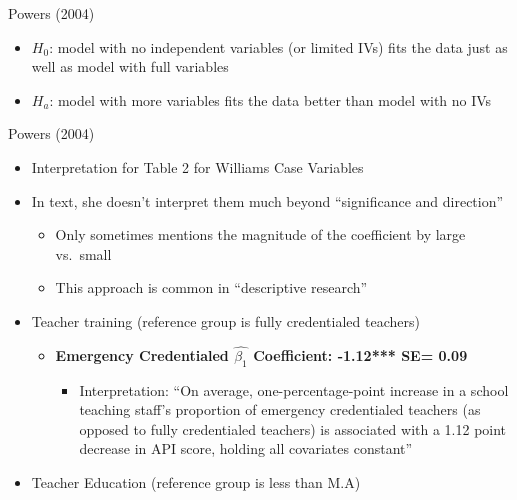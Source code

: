 \documentclass[
  8pt,
  ignorenonframetext,
  dvipsnames]{beamer}
\providecommand{\tightlist}{%
  \setlength{\itemsep}{0pt}\setlength{\parskip}{0pt}}
\renewcommand{\textbf}[1]{{\color{darkgray}\bfseries\fontfamily{Montserrat-TOsF}#1}}
\let\olditem\item
\renewcommand{\item}{%
  \olditem\vspace{4pt}
}
\begin{document}
\begin{frame}{Powers (2004)}
\begin{itemize}
\begin{itemize}
    \begin{itemize}
    \tightlist
    \item
      \(H_0\): model with no independent variables (or limited IVs) fits
      the data just as well as model with full variables
    \item
      \(H_a\): model with more variables fits the data better than model
      with no IVs
    \end{itemize}
  \end{itemize}
\end{itemize}

\end{frame}

\begin{frame}{Powers (2004)}
\protect\hypertarget{powers-2004-2}{}

\begin{itemize}
\tightlist
\item
  Interpretation for Table 2 for Williams Case Variables
\item
  In text, she doesn't interpret them much beyond ``significance and
  direction''

  \begin{itemize}
  \tightlist
  \item
    Only sometimes mentions the magnitude of the coefficient by large
    vs.~small
  \item
    This approach is common in ``descriptive research''
  \end{itemize}
\item
  Teacher training (reference group is fully credentialed teachers)

  \begin{itemize}
  \tightlist
  \item
    \textbf{Emergency Credentialed \(\hat{\beta_1}\) Coefficient:
    -1.12*** SE= 0.09}

    \begin{itemize}
    \tightlist
    \item
      Interpretation: ``On average, one-percentage-point increase in a
      school teaching staff's proportion of emergency credentialed
      teachers (as opposed to fully credentialed teachers) is associated
      with a 1.12 point decrease in API score, holding all covariates
      constant''
    \end{itemize}
  \end{itemize}
\item
  Teacher Education (reference group is less than M.A)


\end{itemize}
\end{frame}
\end{document}
